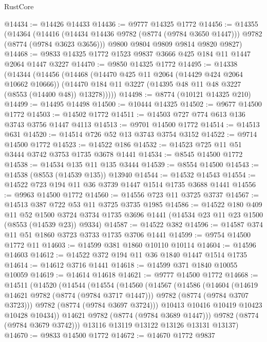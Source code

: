 \begin{lexlean}{RustCore}
\begin{coremodule}
@14434 := @14426 @14433
@14436 := @9777 @14325 @1772
@14456 := @14355
    (@14364
      (@14416 (@14434 @14436 @9782 (@8774 (@9784 @3650 @1447))) @9782 (@8774 (@9784 @3623 @3656)))
      @9800
      @9804
      @9809
      @9814
      @9820
      @9827)
@14468 := @9833 @14325 @1772 @1523 @9837 @3666 @425 @184 @11 @1447 @2064 @1447 @3227
@14470 := @9850 @14325 @1772
@14495 := @14338
    (@14344
      (@14456
        (@14468
          (@14470 @425 @11 @2064 (@14429 @424 @2064 @10662 @10666))
          (@14470 @184 @11 @3227 (@14395 @48 @11 @48 @3227 (@8553 (@14400 @48)) @13278)))))
@14498 := @8774 (@10121 @14325 @210)
@14499 := @14495 @14498
@14500 := @10444 @14325
@14502 := @9677 @14500 @1772
@14503 := @14502 @1772
@14511 := @14503 @727 @774 @613 @136 @3743 @3756 @1447 @4113
@14513 := @9701 @14500 @1772
@14514 := @14513 @631
@14520 := @14514 @726 @52 @13 @3743 @3754 @3152
@14522 := @9714 @14500 @1772
@14523 := @14522 @186
@14532 := @14523 @725 @11 @51 @3444 @3742 @3753 @1735 @3678 @1441
@14534 := @8545 @14500 @1772
@14538 := @14534 @135 @11 @135 @3444
@14539 := @8554 @14500
@14543 := @14538 (@8553 (@14539 @135)) @13940
@14544 := @14532 @14543
@14554 := @14522 @723 @194 @11 @36 @3739 @1447 @1514 @1735 @3688 @1441
@14556 := @9963 @14500 @1772
@14560 := @14556 @723 @11 @3725 @3737
@14567 := @14513 @387 @722 @53 @11 @3725 @3735 @1985
@14586 := @14522
    @180
    @409
    @11
    @52
    @1500
    @3724
    @3734
    @1735
    @3696
    @1441
    (@14534 @23 @11 @23 @1500 (@8553 (@14539 @23)) @9334)
@14587 := @14522 @382
@14596 := @14587 @374 @11 @51 @1860 @3723 @3733 @1735 @3706 @1441
@14599 := @9754 @14500 @1772 @11
@14603 := @14599 @381 @1860 @10110 @10114
@14604 := @14596 @14603
@14612 := @14522 @372 @194 @11 @36 @1840 @1447 @1514 @1735
@14614 := @14612 @3716 @1441
@14618 := @14599 @371 @1840 @10055 @10059
@14619 := @14614 @14618
@14621 := @9777 @14500 @1772
@14668 := @14511
    (@14520
      (@14544
        (@14554
          (@14560
            (@14567
              (@14586
                (@14604
                  (@14619 @14621 @9782 (@8774 (@9784 @3717 @1447)))
                  @9782
                  (@8774 (@9784 @3707 @3723)))
                @9782
                (@8774 (@9784 @3697 @3724)))
              @10413
              @10416
              @10419
              @10423
              @10428
              @10434))
          @14621
          @9782
          (@8774 (@9784 @3689 @1447)))
        @9782
        (@8774 (@9784 @3679 @3742)))
      @13116
      @13119
      @13122
      @13126
      @13131
      @13137)
@14670 := @9833 @14500 @1772
@14672 := @14670 @1772 @9837

\end{coremodule}
\end{lexlean}
